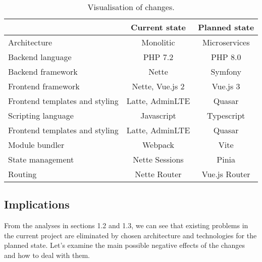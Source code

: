 \begin{table}[ht]
\begin{tabular}{l|c|c|}
\textbf{}                                            & \textbf{Current state} & \textbf{Planned state} \\ \hline
\multicolumn{1}{|l|}{Architecture}                   & Monolitic              & Microservices          \\ \hline
\multicolumn{1}{|l|}{Backend language}               & PHP 7.2                & PHP 8.0                \\ \hline
\multicolumn{1}{|l|}{Backend framework}              & Nette                  & Symfony                \\ \hline
\multicolumn{1}{|l|}{Frontend framework}             & Nette, Vue.js 2        & Vue.js 3               \\ \hline
\multicolumn{1}{|l|}{Frontend templates and styling} & Latte, AdminLTE        & Quasar                 \\ \hline
\multicolumn{1}{|l|}{Scripting language}             & Javascript             & Typescript             \\ \hline
\multicolumn{1}{|l|}{Frontend templates and styling} & Latte, AdminLTE        & Quasar                 \\ \hline
\multicolumn{1}{|l|}{Module bundler}                 & Webpack                & Vite                   \\ \hline
\multicolumn{1}{|l|}{State management}               & Nette Sessions         & Pinia                  \\ \hline
\multicolumn{1}{|l|}{Routing}                        & Nette Router           & Vue.js Router          \\ \hline
\end{tabular}
\caption{\label{demo-table}Visualisation of changes.}
\end{table}

\subsection{Implications} From the analyses in sections 1.2 and 1.3, we can see that existing problems in the current project are eliminated by chosen architecture and technologies for the planned state. Let's examine the main possible negative effects of the changes and how to deal with them.


